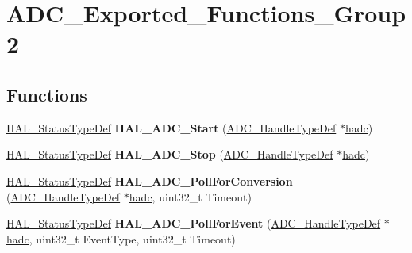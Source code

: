 \hypertarget{group___a_d_c___exported___functions___group2}{\section{A\-D\-C\-\_\-\-Exported\-\_\-\-Functions\-\_\-\-Group2}
\label{group___a_d_c___exported___functions___group2}
}
\subsection*{Functions}
\begin{DoxyCompactItemize}
\item 
\hypertarget{group___a_d_c___exported___functions___group2_ga193666e3bde978627c9ee1e2073c69c0}{\hyperlink{stm32l1xx__hal__def_8h_a63c0679d1cb8b8c684fbb0632743478f}{H\-A\-L\-\_\-\-Status\-Type\-Def} {\bfseries H\-A\-L\-\_\-\-A\-D\-C\-\_\-\-Start} (\hyperlink{struct_a_d_c___handle_type_def}{A\-D\-C\-\_\-\-Handle\-Type\-Def} $\ast$\hyperlink{stm32l1xx__it_8c_a62fcafba91cf315db7e0e0c8f22c656f}{hadc})}\label{group___a_d_c___exported___functions___group2_ga193666e3bde978627c9ee1e2073c69c0}

\item 
\hypertarget{group___a_d_c___exported___functions___group2_ga1b00cb85fc6c0f40fabd02701528711d}{\hyperlink{stm32l1xx__hal__def_8h_a63c0679d1cb8b8c684fbb0632743478f}{H\-A\-L\-\_\-\-Status\-Type\-Def} {\bfseries H\-A\-L\-\_\-\-A\-D\-C\-\_\-\-Stop} (\hyperlink{struct_a_d_c___handle_type_def}{A\-D\-C\-\_\-\-Handle\-Type\-Def} $\ast$\hyperlink{stm32l1xx__it_8c_a62fcafba91cf315db7e0e0c8f22c656f}{hadc})}\label{group___a_d_c___exported___functions___group2_ga1b00cb85fc6c0f40fabd02701528711d}

\item 
\hypertarget{group___a_d_c___exported___functions___group2_gad9c0b5763ab75357407e22d310befc30}{\hyperlink{stm32l1xx__hal__def_8h_a63c0679d1cb8b8c684fbb0632743478f}{H\-A\-L\-\_\-\-Status\-Type\-Def} {\bfseries H\-A\-L\-\_\-\-A\-D\-C\-\_\-\-Poll\-For\-Conversion} (\hyperlink{struct_a_d_c___handle_type_def}{A\-D\-C\-\_\-\-Handle\-Type\-Def} $\ast$\hyperlink{stm32l1xx__it_8c_a62fcafba91cf315db7e0e0c8f22c656f}{hadc}, uint32\-\_\-t Timeout)}\label{group___a_d_c___exported___functions___group2_gad9c0b5763ab75357407e22d310befc30}

\item 
\hypertarget{group___a_d_c___exported___functions___group2_ga139d1a4ab69bea84cb39918840e1a64e}{\hyperlink{stm32l1xx__hal__def_8h_a63c0679d1cb8b8c684fbb0632743478f}{H\-A\-L\-\_\-\-Status\-Type\-Def} {\bfseries H\-A\-L\-\_\-\-A\-D\-C\-\_\-\-Poll\-For\-Event} (\hyperlink{struct_a_d_c___handle_type_def}{A\-D\-C\-\_\-\-Handle\-Type\-Def} $\ast$\hyperlink{stm32l1xx__it_8c_a62fcafba91cf315db7e0e0c8f22c656f}{hadc}, uint32\-\_\-t Event\-Type, uint32\-\_\-t Timeout)}\label{group___a_d_c___exported___functions___group2_ga139d1a4ab69bea84cb39918840e1a64e}


\end{DoxyCompactItemize}

